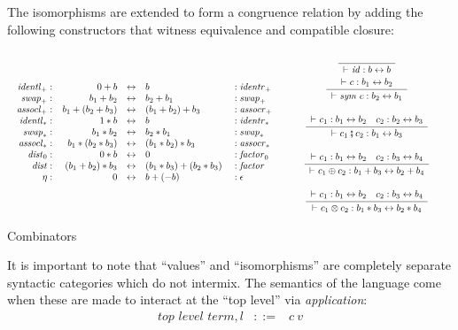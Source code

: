 \documentclass[authoryear,preprint]{sigplanconf}
\newcommand{\Rule}[4]{
\makebox{{\rm #1}
$\displaystyle
\frac{\begin{array}{l}#2\\\end{array}}
{\begin{array}{l}#3\\\end{array}}$
 #4}}
\newcommand{\proves}{\vdash}
\newcommand{\symc}[1]{\mathit{sym}~#1}
\newcommand{\jdg}[3]{#2 \proves_{#1} #3}
\newcommand{\iso}{\leftrightarrow}
\newcommand{\identlp}{\mathit{identl}_+}
\newcommand{\identrp}{\mathit{identr}_+}
\newcommand{\swapp}{\mathit{swap}_+}
\newcommand{\assoclp}{\mathit{assocl}_+}
\newcommand{\assocrp}{\mathit{assocr}_+}
\newcommand{\identlt}{\mathit{identl}_*}
\newcommand{\identrt}{\mathit{identr}_*}
\newcommand{\swapt}{\mathit{swap}_*}
\newcommand{\assoclt}{\mathit{assocl}_*}
\newcommand{\assocrt}{\mathit{assocr}_*}
\newcommand{\distz}{\mathit{dist}_0}
\newcommand{\factorz}{\mathit{factor}_0}
\newcommand{\dist}{\mathit{dist}}
\newcommand{\factor}{\mathit{factor}}
\newcommand{\idc}{\mathit{id}}
\begin{document}
The isomorphisms are extended to form a congruence relation by adding the
following constructors that witness equivalence and compatible closure:

\begin{table*}[t]
\[\begin{array}{cc}
\begin{array}{rrcll}
\identlp :&  0 + b & \iso & b &: \identrp \\
\swapp :&  b_1 + b_2 & \iso & b_2 + b_1 &: \swapp \\
\assoclp :&  b_1 + (b_2 + b_3) & \iso & (b_1 + b_2) + b_3 &: \assocrp \\
\identlt :&  1 * b & \iso & b &: \identrt \\
\swapt :&  b_1 * b_2 & \iso & b_2 * b_1 &: \swapt \\
\assoclt :&  b_1 * (b_2 * b_3) & \iso & (b_1 * b_2) * b_3 &: \assocrt \\
\distz :&~ 0 * b & \iso & 0 &: \factorz \\
\dist :&~ (b_1 + b_2) * b_3 & \iso & (b_1 * b_3) + (b_2 * b_3)~ &: \factor \\
\eta :&~ 0 & \iso & b + (-b)~ & : \epsilon
\end{array}
& 
\begin{minipage}{0.5\textwidth}
\begin{center} 
\Rule{}
{}
{\jdg{}{}{\idc : b \iso b}}
{}
\qquad\qquad
\Rule{}
{\jdg{}{}{c : b_1 \iso b_2}}
{\jdg{}{}{\symc{c} : b_2 \iso b_1}}
{}
\\ \bigskip
\Rule{}
{\jdg{}{}{c_1 : b_1 \iso b_2} \quad c_2 : b_2 \iso b_3}
{\jdg{}{}{c_1 \fatsemi c_2 : b_1 \iso b_3}}
{}
\\ \bigskip
\Rule{}
{\jdg{}{}{c_1 : b_1 \iso b_2} \quad c_2 : b_3 \iso b_4}
{\jdg{}{}{c_1 \oplus c_2 : b_1 + b_3 \iso b_2 + b_4}}
{}
\\ \bigskip
\Rule{}
{\jdg{}{}{c_1 : b_1 \iso b_2} \quad c_2 : b_3 \iso b_4}
{\jdg{}{}{c_1 \otimes c_2 : b_1 * b_3 \iso b_2 * b_4}}
{}
\end{center}
\end{minipage}
\end{array}\]
\caption{Combinators\label{pi-combinators}}
\end{table*}

It is important to note that ``values'' and ``isomorphisms'' are completely
separate syntactic categories which do not intermix. The semantics of the
language come when these are made to interact at the ``top level'' via
\emph{application}: 
\[\begin{array}{lrcl}
\textit{top level term}, l &::=& c~v
\end{array}\]
\end{document}
